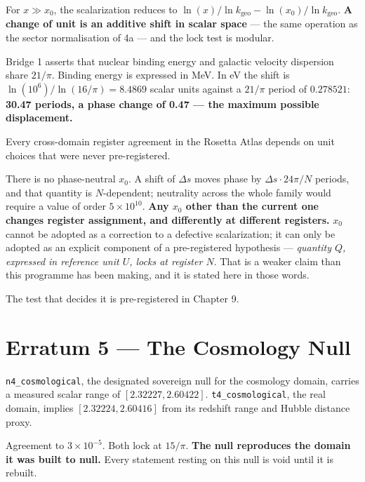 \documentclass[11pt, letterpaper, openany]{book}
\newcommand{\kgeo}{k_{\mathrm{geo}}}
\begin{document}
\begin{erratumbox}
For $x \gg x_0$, the scalarization reduces to
$\ln(x)/\ln \kgeo - \ln(x_0)/\ln \kgeo$. \textbf{A change of unit is an additive shift in scalar
space} --- the same operation as the sector normalisation of 4a --- and the lock test is
modular.

\medskip
Bridge 1 asserts that nuclear binding energy and galactic velocity dispersion share $21/\pi$.
Binding energy is expressed in MeV. In eV the shift is $\ln(10^6)/\ln(16/\pi) = 8.4869$ scalar
units against a $21/\pi$ period of $0.278521$: \textbf{30.47 periods, a phase change of 0.47 ---
the maximum possible displacement.}

\medskip
Every cross-domain register agreement in the Rosetta Atlas depends on unit choices that were
never pre-registered.
\end{erratumbox}

There is no phase-neutral $x_0$. A shift of $\Delta s$ moves phase by $\Delta s \cdot 24\pi/N$
periods, and that quantity is $N$-dependent; neutrality across the whole family would require a
value of order $5\times10^{10}$. \textbf{Any $x_0$ other than the current one changes register
assignment, and differently at different registers.} $x_0$ cannot be adopted as a correction to
a defective scalarization; it can only be adopted as an explicit component of a pre-registered
hypothesis --- \emph{quantity $Q$, expressed in reference unit $U$, locks at register $N$}. That
is a weaker claim than this programme has been making, and it is stated here in those words.

The test that decides it is pre-registered in Chapter 9.

\section{Erratum 5 --- The Cosmology Null}

\begin{erratumbox}
\texttt{n4\_cosmological}, the designated sovereign null for the cosmology domain, carries a
measured scalar range of $[2.32227, 2.60422]$. \texttt{t4\_cosmological}, the real domain,
implies $[2.32224, 2.60416]$ from its redshift range and Hubble distance proxy.

\medskip
Agreement to $3 \times 10^{-5}$. Both lock at $15/\pi$. \textbf{The null reproduces the domain
it was built to null.} Every statement resting on this null is void until it is rebuilt.
\end{erratumbox}
\end{document}
